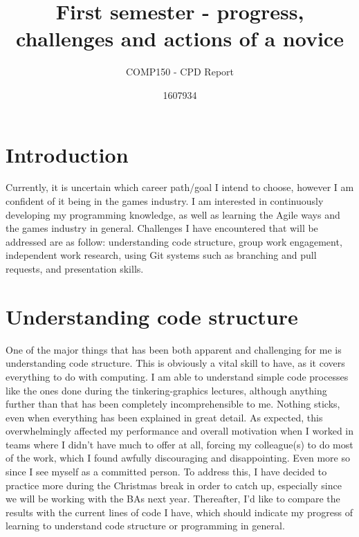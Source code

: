 \documentclass{scrartcl}
\title{First semester - progress, challenges and actions of a novice}
\subtitle{COMP150 - CPD Report}
\author{1607934}
\begin{document}
\maketitle

\section{Introduction}

Currently, it is uncertain which career path/goal I intend to choose, however I am confident of it being in the games industry. I am interested in continuously developing my programming knowledge, as well as learning the Agile ways and the games industry in general. Challenges I have encountered that will be addressed are as follow: understanding code structure, group work engagement, independent work research, using Git systems such as branching and pull requests, and presentation skills. 

\section{Understanding code structure}
One of the major things that has been both apparent and challenging for me is understanding code structure. This is obviously a vital skill to have, as it covers everything to do with computing. I am able to understand simple code processes like the ones done during the tinkering-graphics lectures, although anything further than that has been completely incomprehensible to me. Nothing sticks, even when everything has been explained in great detail. As expected, this overwhelmingly affected my performance and overall motivation when I worked in teams where I didn't have much to offer at all, forcing my colleague(s) to do most of the work, which I found awfully discouraging and disappointing. Even more so since I see myself as a committed person. To address this, I have decided to practice more during the Christmas break in order to catch up, especially since we will be working with the BAs next year. Thereafter, I'd like to compare the results with the current lines of code I have, which should indicate my progress of learning to understand code structure or programming in general.  
\end{document}
